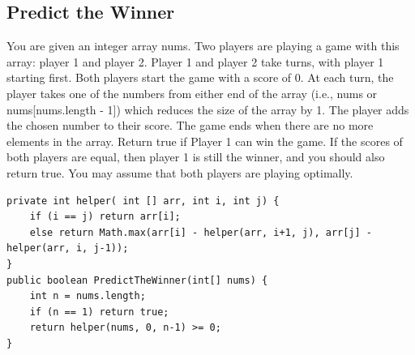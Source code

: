 \documentclass[9pt, b5paper]{article}
\begin{document}
\subsection{Predict the Winner}
\label{sec-17-1}
You are given an integer array nums. Two players are playing a game with this array: player 1 and player 2.
Player 1 and player 2 take turns, with player 1 starting first. Both players start the game with a score of 0. At each turn, the player takes one of the numbers from either end of the array (i.e., nums\footnotemark[3]{} or nums[nums.length - 1]) which reduces the size of the array by 1. The player adds the chosen number to their score. The game ends when there are no more elements in the array.
Return true if Player 1 can win the game. If the scores of both players are equal, then player 1 is still the winner, and you should also return true. You may assume that both players are playing optimally.
\begin{verbatim}
private int helper( int [] arr, int i, int j) {
    if (i == j) return arr[i];
    else return Math.max(arr[i] - helper(arr, i+1, j), arr[j] - helper(arr, i, j-1));
}
public boolean PredictTheWinner(int[] nums) {
    int n = nums.length;
    if (n == 1) return true;
    return helper(nums, 0, n-1) >= 0;
}
\end{verbatim}
\end{document}
